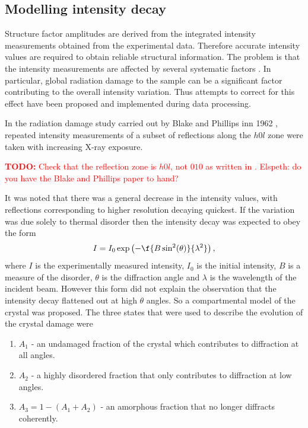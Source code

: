     \subsection{Modelling intensity decay}
    \label{sub:Modelling intensity decay}
        Structure factor amplitudes are derived from the integrated intensity measurements obtained from the experimental data.
        Therefore accurate intensity values are required to obtain reliable structural information.
		The problem is that the intensity measurements are affected by several systematic factors \cite{evans2005}.
		In particular, global radiation damage to the sample can be a significant factor contributing to the overall intensity variation.
		Thus attempts to correct for this effect have been proposed and implemented during data processing.

        In the radiation damage study carried out by Blake and Phillips inn 1962 \cite{blake1962}, repeated intensity measurements of a subset of reflections along the $h0l$ zone were taken with increasing X-ray exposure.
        \textcolor{red}{
            \begin{myenumerate}
                \item \hypertarget{todo:checkrefzone}{\textbf{TODO:} Check that the reflection zone is $h0l$, not $010$ as written in \cite{south2007}. Elspeth: do you have the Blake and Phillips paper to hand?}
            \end{myenumerate}
        }
        It was noted that there was a general decrease in the intensity values, with reflections corresponding to higher resolution decaying quickest.
        If the variation was due solely to thermal disorder then the intensity decay was expected to obey the form
        \begin{equation}
            I = I_0 \exp\left(-\f{B \sin^2(\theta)}{\lambda^2} \right),
        \end{equation}
        where $I$ is the experimentally measured intensity, $I_0$ is the initial intensity, $B$ is a measure of the disorder, $\theta$ is the diffraction angle and $\lambda$ is the wavelength of the incident beam.
        However this form did not explain the observation that the intensity decay flattened out at high $\theta$ angles.
        So a compartmental model of the crystal was proposed. The three states that were used to describe the evolution of the crystal damage were
        \begin{enumerate}
            \item $A_1$ - an undamaged fraction of the crystal which contributes to diffraction at all angles.
            \item $A_2$ - a highly disordered fraction that only contributes to diffraction at low angles.
            \item $A_3 = 1 - (A_1 + A_2)$ - an amorphous fraction that no longer diffracts coherently.
        \end{enumerate}
